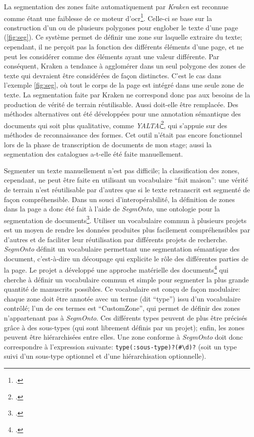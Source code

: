 La segmentation des zones faite automatiquement par \textit{Kraken} est reconnue comme étant une faiblesse de ce moteur d'\gls{ocr}\footcite[p. 1]{clerice_you_2022}. Celle-ci se base sur la construction d'un ou de plusieurs polygones pour englober le texte d'une page (\ref{fig:seg}). Ce système permet de définir une zone sur laquelle extraire du texte; cependant, il ne perçoit pas la fonction des différents éléments d'une page, et ne peut les considérer comme des éléments ayant une valeur différente. Par conséquent, Kraken a tendance à agglomérer dans un seul polygone des zones de texte qui devraient être considérées de façon distinctes. C'est le cas dans l'exemple \ref{fig:seg}, où tout le corps de la page est intégré dans une seule zone de texte. La segmentation faite par Kraken ne correspond donc pas aux besoins de la production de vérité de terrain réutilisable. Aussi doit-elle être remplacée. Des méthodes alternatives ont été développées pour une annotation sémantique des documents qui soit plus qualitative, comme \textit{YALTAi}\footcite{clerice_you_2022}, qui s'appuie sur des méthodes de reconnaissance des formes. Cet outil n'était pas encore fonctionnel lors de la phase de transcription de documents de mon stage; aussi la segmentation des catalogues a-t-elle été faite manuellement.

Segmenter un texte manuellement n'est pas difficile; la classification des zones, cependant, ne peut être faite en utilisant un vocabulaire \enquote{fait maison}: une vérité de terrain n'est réutilisable par d'autres que si le texte retranscrit est segmenté de façon compréhensible. Dans un souci d'interopérabilité, la définition de zones dans la page a donc été fait à l'aide de \textit{SegmOnto}, une ontologie pour la segmentation de documents\footcite{christensen_segmonto_2022, gabay_segmonto_2021}. Utiliser un vocabulaire commun à plusieurs projets est un moyen de rendre les données produites plus facilement compréhensibles par d'autres et de faciliter leur réutilisation par différents projets de recherche. \textit{SegmOnto} définit un vocabulaire permettant une segmentation sémantique des document, c'est-à-dire un découpage qui explicite le rôle des différentes parties de la page. Le projet a développé une approche matérielle des documents\footcite{gabay_segmonto_2021} qui cherche à définir un vocabulaire commun et simple pour segmenter la plus grande quantité de manuscrits possibles. Ce vocabulaire est conçu de façon modulaire: chaque zone doit être annotée avec un terme (dit \enquote{type}) issu d'un vocabulaire contrôlé; l'un de ces termes est \enquote{CustomZone}, qui permet de définir des zones n'appartenant pas à \textit{SegmOnto}. Ces différents types peuvent de plus être précisés grâce à des sous-types (qui sont librement définis par un projet); enfin, les zones peuvent être hiérarchisées entre elles. Une zone conforme à \textit{SegmOnto} doit donc correspondre à l'expression suivante: \texttt{type(:sous-type)?(\#\textbackslash{}d)?} (soit un type suivi d'un sous-type optionnel et d'une hiérarchisation optionnelle).

